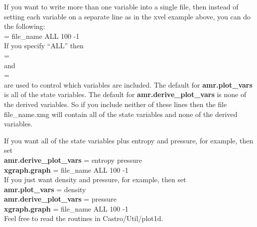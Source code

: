 If you want to write more than one variable into a single file, then instead of
setting each variable on a separate line as in the xvel example above,
you can do the following: \\

 = file\_name ALL 100 -1\\

\noindent If you specify ``ALL'' then \\

 = \\

\noindent and \\

 = \\

\noindent are used to control which variables are included.  The default for {\bf amr.plot\_vars}
is all of the state variables.  The default for {\bf amr.derive\_plot\_vars} is none of
the derived variables.  So if you include neither of these lines then the file 
file\_name.xmg will contain all of the state variables and none of the derived variables.

If you want all of the state variables plus entropy and pressure, for example, then set \\

{\bf amr.derive\_plot\_vars} = entropy pressure \\

{\bf xgraph.graph} = file\_name ALL 100 -1\\

If you just want density and pressure, for example, then set \\

{\bf amr.plot\_vars} =  density \\

{\bf amr.derive\_plot\_vars} = pressure \\

{\bf xgraph.graph} = file\_name ALL 100 -1\\ 

Feel free to read the routines in Castro/Util/plot1d.

